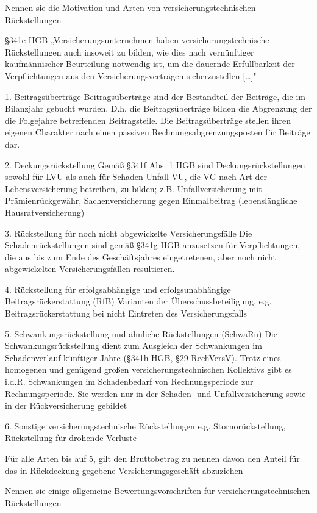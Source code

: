 Nennen sie die Motivation und Arten von versicherungstechnischen Rückstellungen  


§341e HGB
„Versicherungsunternehmen haben versicherungstechnische Rückstellungen auch insoweit zu bilden, wie dies nach vernünftiger
kaufmännischer Beurteilung notwendig ist, um die dauernde Erfüllbarkeit der Verpflichtungen aus den Versicherungsverträgen
sicherzustellen […]"


1. Beitragsüberträge
Beitragsüberträge sind der Bestandteil der Beiträge, die im Bilanzjahr gebucht wurden. 
D.h. die Beitragsüberträge bilden die Abgrenzung der die Folgejahre betreffenden Beitragsteile.
Die Beitragsüberträge stellen ihren eigenen Charakter nach einen passiven Rechnungsabgrenzungsposten für Beiträge dar.

2. Deckungsrückstellung
Gemäß §341f Abs. 1 HGB sind Deckungsrückstellungen sowohl für LVU als auch für Schaden-Unfall-VU, die VG nach Art der Lebensversicherung
betreiben, zu bilden; z.B. Unfallversicherung mit Prämienrückgewähr, Sachenversicherung gegen Einmalbeitrag (lebenslängliche Hausratversicherung)

3. Rückstellung für noch nicht abgewickelte Versicherungsfälle
Die Schadenrückstellungen sind gemäß §341g HGB anzusetzen für Verpflichtungen, die aus bis zum Ende des Geschäftsjahres eingetretenen, aber
noch nicht abgewickelten Versicherungsfällen resultieren.

4. Rückstellung für erfolgsabhängige und erfolgsunabhängige Beitragsrückerstattung (RfB)
Varianten der Überschussbeteiligung, e.g. Beitragsrückerstattung bei nicht Eintreten des Versicherungsfalls

5. Schwankungsrückstellung und ähnliche Rückstellungen (SchwaRü)
Die Schwankungsrückstellung dient zum Ausgleich der Schwankungen im Schadenverlauf künftiger Jahre (§341h HGB, §29 RechVersV). Trotz
eines homogenen und genügend großen versicherungstechnischen Kollektivs gibt es i.d.R. Schwankungen im Schadenbedarf von Rechnungsperiode
zur Rechnungsperiode.
Sie werden nur in der Schaden- und Unfallversicherung sowie in der Rückversicherung gebildet

6. Sonstige versicherungstechnische Rückstellungen
e.g. Stornorückstellung, Rückstellung für drohende Verluste

Für alle Arten bis auf 5, gilt den 
Bruttobetrag zu nennen davon den Anteil für das in Rückdeckung gegebene Versicherungsgeschäft abzuziehen


Nennen sie einige allgemeine Bewertungsvorschriften für versicherungstechnischen Rückstellungen

